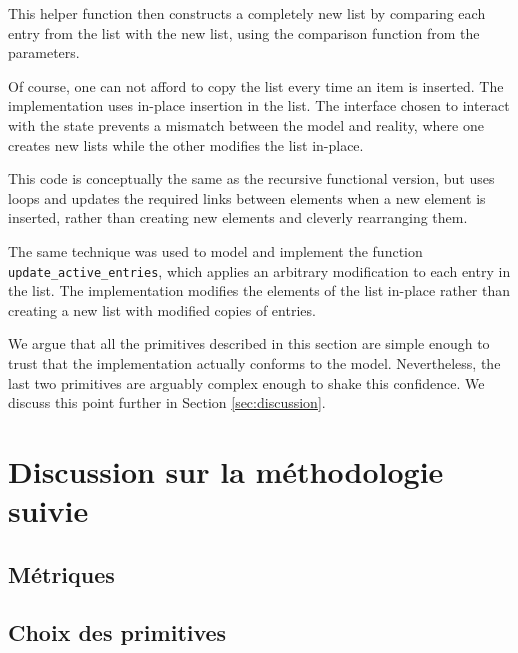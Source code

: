 	This helper function then constructs a completely new list by comparing each entry from the list with the new list, using the comparison function from the parameters. 

	Of course, one can not afford to copy the list every time an item is inserted. The implementation uses in-place insertion in the list. The interface chosen to interact with the state prevents a mismatch between the model and reality, where one creates new lists while the other modifies the list in-place.

	This code is conceptually the same as the recursive functional version, but uses loops and updates the required links between elements when a new element is inserted, rather than creating new elements and cleverly rearranging them.

	The same technique was used to model and implement the function \texttt{update\_active\_entries}, which applies an arbitrary modification to each entry in the list. The implementation modifies the elements of the list in-place rather than creating a new list with modified copies of entries.

	\label{sec:implementation}

	We argue that all the primitives described in this section are simple enough to trust that the implementation actually conforms to the model. Nevertheless, the last two primitives are arguably complex enough to shake this confidence. We discuss this point further in Section \ref{sec:discussion}.

	\section{Discussion sur la méthodologie suivie}
		\subsection{Métriques}
		\subsection{Choix des primitives}
